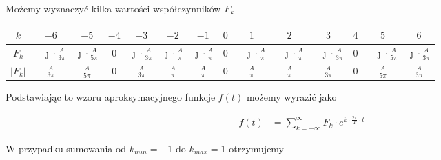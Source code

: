 \begin{task}
Możemy wyznaczyć kilka wartości współczynników $F_k$

\begin{table}[H]
\centering  
\begin{tabular}{|c|c|c|c|c|c|c|c|c|c|c|c|c|c|}
  \hline 
  $k$ & $-6$ & $-5$ & $-4$ & $-3$ & $-2$ & $-1$ & $0$ & $1$ & $2$ & $3$ & $4$ & $5$ & $6$\\ 
  \hline 
  $F_k$ & $-\jmath \cdot \frac{A}{3\pi}$ & $\jmath \cdot \frac{A}{5\pi}$ & $0$ & $\jmath \cdot \frac{A}{3\pi}$ & $\jmath \cdot \frac{A}{\pi}$ & $\jmath \cdot \frac{A}{\pi}$ & $0$ & $-\jmath \cdot \frac{A}{\pi}$ & $-\jmath \cdot \frac{A}{\pi}$ & $-\jmath \cdot \frac{A}{3\pi}$ & $0$ & $-\jmath \cdot \frac{A}{5\pi}$ & $\jmath \cdot \frac{A}{3\pi}$\\
  \hline 
  $\left|F_k\right|$ & $\frac{A}{3\pi}$ & $\frac{A}{5\pi}$ & $0$ & $\frac{A}{3\pi}$ & $\frac{A}{\pi}$ & $\frac{A}{\pi}$ & $0$ & $\frac{A}{\pi}$ & $\frac{A}{\pi}$ & $\frac{A}{3\pi}$ & $0$ & $\frac{A}{5\pi}$ & $\frac{A}{3\pi}$\\ 
  \hline 
  
\end{tabular} 
\end{table}

Podstawiając to wzoru aproksymacyjnego funkcje $f(t)$ możemy wyrazić jako

\begin{equation}
\begin{aligned}
f(t) &= \sum_{k=-\infty}^{\infty} F_k \cdot e^{k \cdot \frac{2\pi}{T} \cdot t}
\end{aligned}
\end{equation}

W przypadku sumowania od $k_{min}=-1$ do $k_{max}=1$ otrzymujemy 

\begin{figure}[H]
  \centering
\end{figure}
\end{task}
